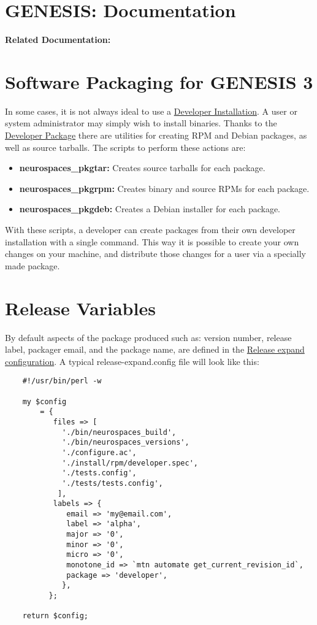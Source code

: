 \documentclass[12pt]{article}
\begin{document}
\section*{GENESIS: Documentation}

{\bf Related Documentation:}

\section*{Software Packaging for GENESIS 3}

In some cases, it is not always ideal to use a \href{../installation-developer/installation-developer.tex}{Developer Installation}.  A user or system administrator may simply wish to install binaries. Thanks to the \href{../developer-package/developer-package.tex}{Developer Package} there are utilities for creating RPM and Debian packages, as well as source tarballs. The scripts to perform these actions are:

\begin{itemize}
\item[] {\bf neurospaces\_pkgtar:} Creates source tarballs for each package.
\item[] {\bf neurospaces\_pkgrpm:} Creates binary and source RPMs for each package.
\item[] {\bf neurospaces\_pkgdeb:} Creates a Debian installer for each package. 
\end{itemize}

With these scripts, a developer can create packages from their own developer installation with a single command. This way it is possible to create your own changes on your machine, and distribute those changes for a user via a specially made package. 


\section*{Release Variables}

By default aspects of the package produced such as: version number, release label, packager email, and the package name, are defined in the \href{../release-expand/release-expand.tex}{Release expand configuration}. A typical release-expand.config file will look like this:

\begin{verbatim}
	#!/usr/bin/perl -w

	my $config
	    = {
	       files => [
			 './bin/neurospaces_build',
			 './bin/neurospaces_versions',
			 './configure.ac',
			 './install/rpm/developer.spec',
			 './tests.config',
			 './tests/tests.config',
			],
	       labels => {
			  email => 'my@email.com',
			  label => 'alpha',
			  major => '0',
			  minor => '0',
			  micro => '0',
			  monotone_id => `mtn automate get_current_revision_id`,
			  package => 'developer',
			 },
	      };

	return $config;
\end{verbatim}
\end{document}
